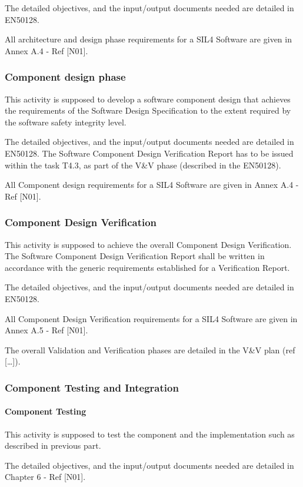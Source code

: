 \documentclass{template/openetcs_article}
\begin{document}
The detailed objectives, and the input/output documents needed are detailed in EN50128.

All architecture and design phase requirements for a SIL4 Software are given in Annex A.4 - Ref [N01].


\subsubsection{Component design phase}
This activity is supposed to develop a software component design that achieves the requirements of the Software Design Specification to the extent required by the software safety integrity level.

The detailed objectives, and the input/output documents needed are detailed in EN50128. The Software Component Design Verification Report has to be issued within the task T4.3, as part of the V\&V phase (described in the EN50128).

All Component design requirements for a SIL4 Software are given in Annex A.4 - Ref [N01].


\subsubsection{Component Design Verification}
This activity is supposed to achieve the overall Component Design Verification. The Software Component Design Verification Report shall be written in accordance with the generic requirements established for a Verification Report.

The detailed objectives, and the input/output documents needed are detailed in EN50128.

All Component Design Verification requirements for a SIL4 Software are given in Annex A.5 - Ref [N01].

The overall Validation and Verification phases are detailed in the V\&V plan (ref [{\dots}]).


\subsubsection{Component Testing and Integration}
\paragraph{Component Testing}
This activity is supposed to test the component and the implementation such as described in previous part.

The detailed objectives, and the input/output documents needed are detailed in Chapter 6  {}- Ref [N01].
\end{document}
